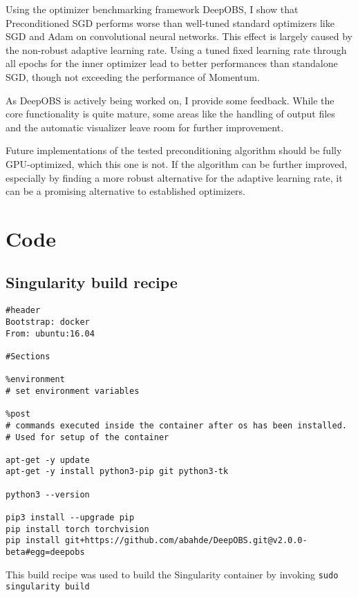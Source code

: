 \documentclass[twoside,12pt,a4paper]{report}
\begin{document}
Using the optimizer benchmarking framework DeepOBS, I show that Preconditioned SGD performs worse than well-tuned standard optimizers like SGD and Adam on convolutional neural networks. This effect is largely caused by the non-robust adaptive learning rate. Using a tuned fixed learning rate through all epochs for the inner optimizer lead to better performances than standalone SGD, though not exceeding the performance of Momentum.

As DeepOBS is actively being worked on, I provide some feedback. While the core functionality is quite mature, some areas like the handling of output files and the automatic visualizer leave room for further improvement.

Future implementations of the tested preconditioning algorithm should be fully GPU-optimized, which this one is not.
If the algorithm can be further improved, especially by finding a more robust alternative for the adaptive learning rate, it can be a promising alternative to established optimizers.


\appendix %
\chapter{Code}
\section{Singularity build recipe}
\begin{verbatim}
#header
Bootstrap: docker
From: ubuntu:16.04

#Sections

%environment
# set environment variables

%post
# commands executed inside the container after os has been installed.
# Used for setup of the container

apt-get -y update
apt-get -y install python3-pip git python3-tk

python3 --version

pip3 install --upgrade pip
pip install torch torchvision
pip install git+https://github.com/abahde/DeepOBS.git@v2.0.0-beta#egg=deepobs

\end{verbatim}
This build recipe was used to build the Singularity container by invoking \verb|sudo singularity build|
\end{document}

